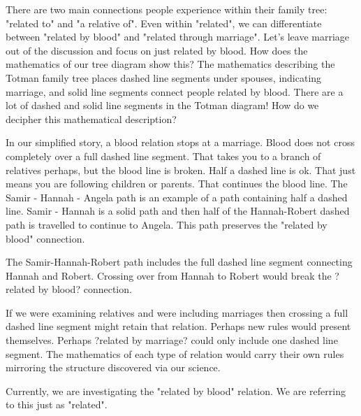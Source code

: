 \documentclass{ximera}
\begin{document}
There are two main connections people experience within their family tree: "related to" and "a relative of". Even within "related", we can differentiate between "related by blood" and "related through marriage". Let's leave marriage out of the discussion and focus on just related by blood.  How does the mathematics of our tree diagram show this?
The mathematics describing the Totman family tree places dashed line segments under spouses, indicating marriage, and solid line segments connect people related by blood. There are a lot of dashed and solid line segments in the Totman diagram!  How do we decipher this mathematical description?

In our simplified story, a blood relation stops at a marriage.  Blood does not cross completely over a full dashed line segment. That takes you to a branch of relatives perhaps, but the blood line is broken.  Half a dashed line is ok.  That just means you are following children or parents.  That continues the blood line.
The Samir - Hannah - Angela path is an example of a path containing half a dashed line. Samir - Hannah is a solid path and then half of the Hannah-Robert dashed path is travelled to continue to Angela.  This path preserves the "related by blood" connection.

The Samir-Hannah-Robert path includes the full dashed line segment connecting Hannah and Robert.  Crossing over from Hannah to Robert would break the ?related by blood? connection.

If we were examining relatives and were including marriages then crossing a full dashed line segment might retain that relation. Perhaps new rules would present themselves. Perhaps ?related by marriage? could only include one dashed line segment.  The mathematics of each type of relation would carry their own rules mirroring the structure discovered via our science.

Currently, we are investigating the "related by blood" relation. We are referring to this just as "related".
\end{document}

